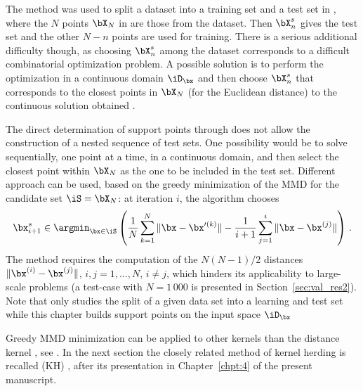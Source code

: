 The method was used to split a dataset into a training set and a test set in \citet{josvak21}, where the $N$ points $\bX_N$ in  are those from the dataset.
Then $\bX_n^s$ gives the test set and the other $N-n$ points are used for training. 
There is a serious additional difficulty though, as choosing $\bX_n^s$ among the dataset corresponds to a difficult combinatorial optimization problem. 
A possible solution is to perform the optimization in a continuous domain $\iD_\bx$ and then choose $\bX_n^s$ that corresponds to the closest points in $\bX_N$ (for the Euclidean distance) to the continuous solution obtained \citep{josvak21}. 

The direct determination of support points through  does not allow the construction of a nested sequence of test sets. 
One possibility would be to solve  sequentially, one point at a time, in a continuous domain, and then select the closest point within $\bX_N$ as the one to be included in the test set. 
Different approach can be used, based on the greedy minimization of the MMD  for the candidate set $\iS=\bX_N$: at iteration $i$, the algorithm chooses
\begin{equation}\label{eq:GreedySP}
\bx_{i+1}^s \in \argmin_{\bx\in\iS} \left( \frac{1}{N} \sum_{k=1}^N \|\bx-\bx'^{(k)}\| - \frac{1}{i+1} \sum_{j=1}^{i} \|\bx-\bx^{(j)}\| \right) \,.
\end{equation}
The method requires the computation of the $N(N-1)/2$ distances $\|\bx^{(i)}-\bx^{(j)}\|$, $i,j=1,\ldots,N$, $i\neq j$, which hinders its applicability to large-scale problems (a test-case with $N=1\,000$ is presented in Section~\ref{sec:val_res2}). 
Note that \citet{josvak21} only studies the split of a given data set into a learning and test set while this chapter builds support points on the input space $\iD_\bx$

Greedy MMD minimization can be applied to other kernels than the distance kernel , see \citet{teymur_gorham_2021,pronzato_2021}. 
In the next section the closely related method of kernel herding is recalled (KH) \citep{chen_welling_2010}, after its presentation in Chapter~\ref{chpt:4} of the present manuscript.

